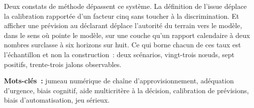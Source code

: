 Deux constats de m\'ethode d\'epassent ce syst\`eme. La d\'efinition de l'issue d\'eplace la
calibration rapport\'ee d'un facteur cinq sans toucher \`a la discrimination. Et afficher une
pr\'evision au d\'eclarant d\'eplace l'autorit\'e du terrain vers le mod\`ele, dans le sens
o\`u pointe le mod\`ele, sur une couche qu'un rapport calendaire \`a deux nombres surclasse
\`a six horizons sur huit. Ce qui borne chacun de ces taux est l'\'echantillon et non la
construction~: deux sc\'enarios, vingt-trois n\oe{}uds, sept positifs, trente-trois jalons
observables.

\vspace{0.4cm}

\noindent\textbf{Mots-cl\'es~:} jumeau num\'erique de cha\^ine d'approvisionnement,
ad\'equation d'urgence, biais cognitif, aide multicrit\`ere \`a la d\'ecision, calibration de
pr\'evisions, biais d'automatisation, jeu s\'erieux.
